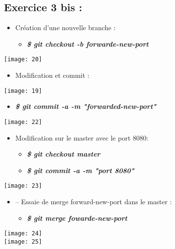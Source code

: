 \documentclass[a4paper]{article}
\begin{document}
	\subsection{Exercice 3 bis :}
	\begin{itemize}
		\item Création d'une nouvelle branche :
		\begin{itemize}
			\item \textbf{\textit{\$ git checkout -b forwarde-new-port}}
		\end{itemize}
	\end{itemize}
	\texttt{[image: 20]}
	
	\begin{itemize}
		\item Modification et commit :
	\end{itemize}
	\texttt{[image: 19]}
	

		\begin{itemize}
			\item \textbf{\textit{\$ git commit -a -m  "forwarded-new-port"}}
		\end{itemize}
	\texttt{[image: 22]}
	
	\begin{itemize}
		\item Modification sur le master avec le port 8080:
		\begin{itemize}
			\item \textbf{\textit{\$ git checkout master}}
			\item \textbf{\textit{\$ git commit -a -m "port 8080"}}
		\end{itemize}
	\end{itemize}
	\texttt{[image: 23]}
	
	\begin{itemize}
		\item –	Essaie de merge forward-new-port dans le master :
		\begin{itemize}
			\item \textbf{\textit{\$ git merge fowarde-new-port}}
		\end{itemize}
	\end{itemize}
	
	\texttt{[image: 24]} \\
	\texttt{[image: 25]}
\end{document}
